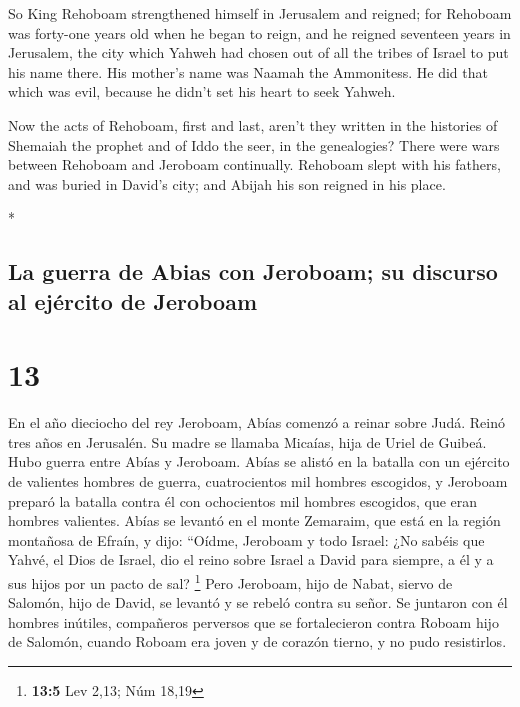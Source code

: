 \begin{paracol}{2}
\begin{otherlanguage}{english}
 So King Rehoboam strengthened himself in Jerusalem and
reigned; for Rehoboam was forty-one years old when he began to reign,
and he reigned seventeen years in Jerusalem, the city which Yahweh had
chosen out of all the tribes of Israel to put his name there. His
mother's name was Naamah the Ammonitess.  He did that
which was evil, because he didn't set his heart to seek Yahweh.

 Now the acts of Rehoboam, first and last, aren't they
written in the histories of Shemaiah the prophet and of Iddo the seer,
in the genealogies? There were wars between Rehoboam and Jeroboam
continually.  Rehoboam slept with his fathers, and was
buried in David's city; and Abijah his son reigned in his place.

\end{otherlanguage}

\switchcolumn[0]*

\hypertarget{la-guerra-de-abias-con-jeroboam-su-discurso-al-ejuxe9rcito-de-jeroboam}{%
\subsection{La guerra de Abias con Jeroboam; su discurso al ejército de
Jeroboam}\label{la-guerra-de-abias-con-jeroboam-su-discurso-al-ejuxe9rcito-de-jeroboam}}

\hypertarget{section-24}{%
\section{13}\label{section-24}}

 En el año dieciocho del rey Jeroboam, Abías comenzó a
reinar sobre Judá.  Reinó tres años en Jerusalén. Su madre
se llamaba Micaías, hija de Uriel de Guibeá. Hubo guerra entre Abías y
Jeroboam.  Abías se alistó en la batalla con un ejército
de valientes hombres de guerra, cuatrocientos mil hombres escogidos, y
Jeroboam preparó la batalla contra él con ochocientos mil hombres
escogidos, que eran hombres valientes.  Abías se levantó
en el monte Zemaraim, que está en la región montañosa de Efraín, y dijo:
``Oídme, Jeroboam y todo Israel:  ¿No sabéis que Yahvé, el
Dios de Israel, dio el reino sobre Israel a David para siempre, a él y a
sus hijos por un pacto de sal? \footnote{\textbf{13:5} Lev 2,13; Núm
  18,19}  Pero Jeroboam, hijo de Nabat, siervo de Salomón,
hijo de David, se levantó y se rebeló contra su señor.  Se
juntaron con él hombres inútiles, compañeros perversos que se
fortalecieron contra Roboam hijo de Salomón, cuando Roboam era joven y
de corazón tierno, y no pudo resistirlos.


\end{paracol}
